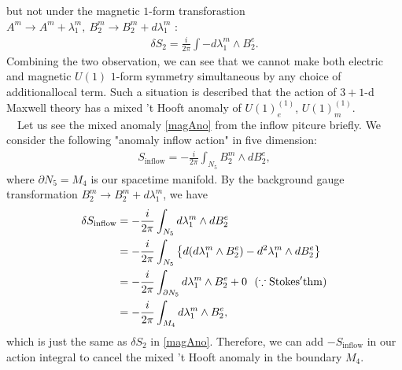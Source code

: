 \documentclass{ltjsarticle}
\theoremstyle{mystyle} %
\numberwithin{equation}{section}
\begin{document}
but not under the magnetic $1$-form transforastion $
A^m\to A^m + \lambda^m_1, ~B^m_2\to B^m_2 + d\lambda^m_1$ : 
\begin{align}
    \delta S_2 = \frac{i}{2\pi}\int -d\lambda^m_1\wedge B^e_2. 
    \label{magAno}
\end{align}
Combining the two observation, we can see that 
we cannot make both electric and magnetic $U(1)$ $1$-form symmetry simultaneous by any choice of additionallocal term. 
Such a situation is described that the action of $3+1$-d Maxwell theory has a mixed 't Hooft anomaly of $U(1)^{(1)}_e$, $U(1)^{(1)}_m$. \\
　Let us see the mixed anomaly \eqref{magAno} from the inflow pitcure briefly. 
We consider the following "anomaly inflow action" in five dimension: 
\begin{align}
    S_{\mathrm{inflow}} = -\frac{i}{2\pi}\int_{N_{5}} B^{m}_2\wedge dB^e_2, 
\end{align}
where $\partial N_5 = M_4$ is our spacetime manifold. By the background gauge transformation $B^m_2 \to B^m_2 + d \lambda^m_1$, we have
\begin{align}
    \delta S_{\mathrm{inflow}} &= -\frac{i}{2\pi}\int_{N_5} d\lambda^m_1 \wedge dB^e_2 \\
    &=-\frac{i}{2\pi}\int_{N_5}\left\{{d(d\lambda^m_1\wedge B^e_2)-d^2\lambda^m_1 \wedge dB^e_2}\right\}\\
    &=-\frac{i}{2\pi}\int_{\partial N_5}d\lambda^m_1\wedge B^e_2 + 0~~
    (\because \mathrm{Stokes' thm})\\
    &=-\frac{i}{2\pi}\int_{M_4}d\lambda^m_1\wedge B^e_2, 
\end{align}
which is just the same as $\delta S_2$ in \eqref{magAno}. 
Therefore, we can add $-S_{\mathrm{inflow}}$ in our action integral to cancel the mixed 't Hooft anomaly 
in the boundary $M_4$. 
\end{document}
